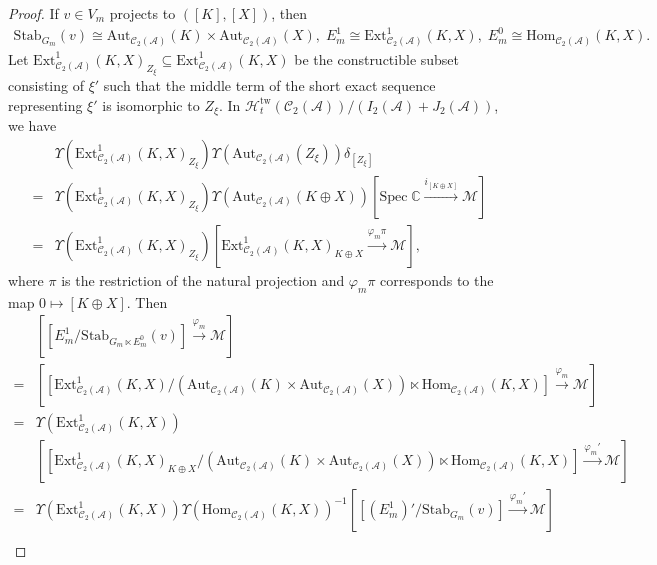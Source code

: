 \documentclass[12pt]{amsart}
\theoremstyle{definition}
\numberwithin{equation}{section}
\begin{document}
\begin{proof}
   If $ v \in V_m $ projects to $ ([K],[X]) $, then
\begin{align*}
    \mathrm{Stab}_{G_m}(v) \cong \mathrm{Aut}_{\mathcal{C}_2(\mathcal{A})}(K) \times \mathrm{Aut}_{\mathcal{C}_2(\mathcal{A})}(X),\;E_m^1 \cong \mathrm{Ext}^1_{\mathcal{C}_2(\mathcal{A})}(K,X),\; E_m^0 \cong \mathrm{Hom}_{\mathcal{C}_2(\mathcal{A})}(K,X). 
\end{align*}
Let $  \mathrm{Ext}^1_{\mathcal{C}_2(\mathcal{A})}(K, X)_{Z_{\xi}} \subseteq \mathrm{Ext}^1_{\mathcal{C}_2(\mathcal{A})}(K, X) $  be the constructible subset consisting of $ \xi' $  such that the middle term of the short exact sequence representing $ \xi' $ is isomorphic to $ Z_{\xi} $.
In $ \mathcal{H}_t^{\mathrm{tw}}(\mathcal{C}_2(\mathcal{A}))/(I_2(\mathcal{A})+J_2(\mathcal{A})) $, we have
\begin{align*}
    &\Upsilon(\mathrm{Ext}^1_{\mathcal{C}_2(\mathcal{A})}(K, X)_{Z_{\xi}})\Upsilon(\mathrm{Aut}_{\mathcal{C}_2(\mathcal{A})}(Z_{\xi}))\delta_{[Z_{\xi}]} \\
    =& \Upsilon(\mathrm{Ext}^1_{\mathcal{C}_2(\mathcal{A})}(K, X)_{Z_{\xi}})\Upsilon(\mathrm{Aut}_{\mathcal{C}_2(\mathcal{A})}(K \oplus X))[\mathrm{Spec}\;\mathbb{C} \xrightarrow{i_{[K \oplus X]}} \mathcal{M}] \\
    =& \Upsilon(\mathrm{Ext}^1_{\mathcal{C}_2(\mathcal{A})}(K, X)_{Z_{\xi}})[\mathrm{Ext}^1_{\mathcal{C}_2(\mathcal{A})}(K,X)_{K \oplus X} \xrightarrow{\varphi_m\pi} \mathcal{M}],
\end{align*}
where $ \pi $ is the restriction of the natural projection and $ \varphi_m \pi $  corresponds to the map $ 0 \mapsto [K \oplus X] $. 
Then
\begin{align*}
    &[[E_m^1/\mathrm{Stab}_{G_m \ltimes E_m^0}(v)] \xrightarrow{\varphi_m} \mathcal{M}] \\
    =& [[\mathrm{Ext}^1_{\mathcal{C}_2(\mathcal{A})}(K,X) /(\mathrm{Aut}_{\mathcal{C}_2(\mathcal{A})}(K) \times \mathrm{Aut}_{\mathcal{C}_2(\mathcal{A})}(X)) \ltimes \mathrm{Hom}_{\mathcal{C}_2(\mathcal{A})}(K, X)] \xrightarrow{\varphi_m} \mathcal{M}] \\
    =& \Upsilon(\mathrm{Ext}^1_{\mathcal{C}_2(\mathcal{A})}(K,X))\\
    &[[\mathrm{Ext}^1_{\mathcal{C}_2(\mathcal{A})}(K,X)_{K \oplus X}/(\mathrm{Aut}_{\mathcal{C}_2(\mathcal{A})}(K) \times \mathrm{Aut}_{\mathcal{C}_2(\mathcal{A})}(X)) \ltimes \mathrm{Hom}_{\mathcal{C}_2(\mathcal{A})}(K, X)] \xrightarrow{\varphi_m'} \mathcal{M}] \\
    =& \Upsilon(\mathrm{Ext}^1_{\mathcal{C}_2(\mathcal{A})}(K,X))\Upsilon(\mathrm{Hom}_{\mathcal{C}_2(\mathcal{A})}(K, X))^{-1}[[(E_m^1)'/\mathrm{Stab}_{G_m}(v)] \xrightarrow{\varphi_m'} \mathcal{M}] \\

\end{align*}
\end{proof}
\end{document}
